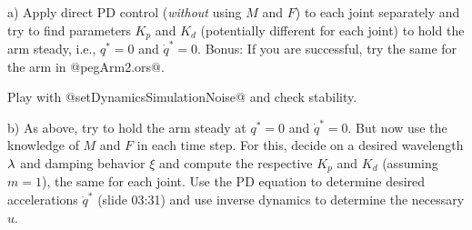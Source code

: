 a) Apply direct PD control (\emph{without} using $M$ and $F$) to each
joint separately and try to find parameters $K_p$ and $K_d$
(potentially different for each joint) to hold the arm steady, i.e.,
$q^*=0$ and $\dot q^*=0$. Bonus: If you are successful, try the same for the
arm in @pegArm2.ors@.

Play with @setDynamicsSimulationNoise@ and check stability.


b) As above, try to hold the arm steady at $q^*=0$ and $\dot q^*=0$. But
now use the knowledge of $M$ and $F$ in each time step. For this,
decide on a desired wavelength $\lambda$ and damping behavior $\xi$ and
compute the respective $K_p$ and $K_d$ (assuming $m=1$), the same for
each joint. Use the PD equation to determine desired accelerations
$\ddot q^*$ (slide 03:31) and use inverse dynamics to determine the
necessary $u$.







